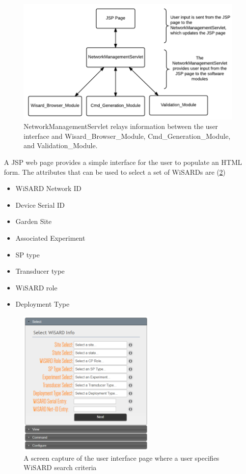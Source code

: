\begin{figure}[H]
	\centering
	\includegraphics[width=\textwidth]{figures/jsp_interaction.png}
	\caption{NetworkManagementServlet relays information between the user interface and Wisard\_Browser\_Module, Cmd\_Generation\_Module, and Validation\_Module.}
	\label{fig:jsp_interaction}
\end{figure} 

A JSP web page provides a simple interface for the user to populate an HTML form. The attributes that can be used to select a set of WiSARDs are (\ref{fig:jsp_ui_select})

\begin{itemize}
	\item WiSARD Network ID
	\item Device Serial ID
	\item Garden Site
	\item Associated Experiment
	\item SP type
	\item Transducer type
	\item WiSARD role
	\item Deployment Type
\end{itemize} 

\begin{figure}[H]
	\centering
	\includegraphics[width=0.6\textwidth]{figures/jsp_ui_select.png}
	\caption{A screen capture of the user interface page where a user specifies WiSARD search criteria}
	\label{fig:jsp_ui_select}
\end{figure}

